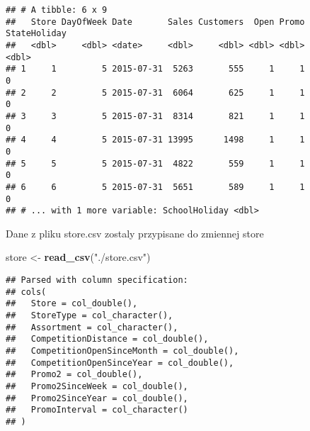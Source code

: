 \documentclass[]{article}
\newenvironment{Shaded}{\begin{snugshade}}{\end{snugshade}}
\newcommand{\KeywordTok}[1]{\textcolor[rgb]{0.13,0.29,0.53}{\textbf{#1}}}
\newcommand{\NormalTok}[1]{#1}
\newcommand{\OperatorTok}[1]{\textcolor[rgb]{0.81,0.36,0.00}{\textbf{#1}}}
\newcommand{\StringTok}[1]{\textcolor[rgb]{0.31,0.60,0.02}{#1}}
\begin{document}
\begin{Shaded}
\end{Shaded}

\begin{verbatim}
## # A tibble: 6 x 9
##   Store DayOfWeek Date       Sales Customers  Open Promo StateHoliday
##   <dbl>     <dbl> <date>     <dbl>     <dbl> <dbl> <dbl>        <dbl>
## 1     1         5 2015-07-31  5263       555     1     1            0
## 2     2         5 2015-07-31  6064       625     1     1            0
## 3     3         5 2015-07-31  8314       821     1     1            0
## 4     4         5 2015-07-31 13995      1498     1     1            0
## 5     5         5 2015-07-31  4822       559     1     1            0
## 6     6         5 2015-07-31  5651       589     1     1            0
## # ... with 1 more variable: SchoolHoliday <dbl>
\end{verbatim}

Dane z pliku store.csv zostaly przypisane do zmiennej store

\begin{Shaded}
\begin{Highlighting}[]
\NormalTok{store <-}\StringTok{ }\KeywordTok{read_csv}\NormalTok{(}\StringTok{"./store.csv"}\NormalTok{)}
\end{Highlighting}
\end{Shaded}

\begin{verbatim}
## Parsed with column specification:
## cols(
##   Store = col_double(),
##   StoreType = col_character(),
##   Assortment = col_character(),
##   CompetitionDistance = col_double(),
##   CompetitionOpenSinceMonth = col_double(),
##   CompetitionOpenSinceYear = col_double(),
##   Promo2 = col_double(),
##   Promo2SinceWeek = col_double(),
##   Promo2SinceYear = col_double(),
##   PromoInterval = col_character()
## )
\end{verbatim}

\begin{Shaded}
\end{Shaded}
\end{document}
